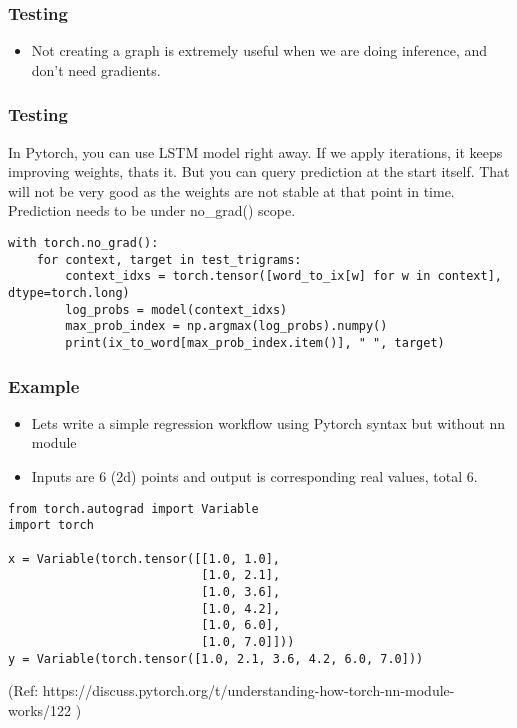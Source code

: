 \begin{frame}[fragile]
\frametitle{Testing}
\begin{itemize}
\item Not creating a graph is extremely useful when we are doing inference, and don't need gradients.
\end{itemize}
   
\end{frame} 

\begin{frame}[fragile]
\frametitle{Testing}
 In Pytorch, you can use LSTM model right away. If we apply iterations, it keeps improving weights, thats it. But you can query prediction at the start itself. That will not be very good as the weights are not stable at that point in time. Prediction needs to be under no\_grad() scope.
 
 \begin{lstlisting}
with torch.no_grad():
    for context, target in test_trigrams:
        context_idxs = torch.tensor([word_to_ix[w] for w in context], dtype=torch.long)
        log_probs = model(context_idxs)
        max_prob_index = np.argmax(log_probs).numpy()
        print(ix_to_word[max_prob_index.item()], " ", target)
\end{lstlisting}     
\end{frame} 

\begin{frame}[fragile]
\frametitle{Example}
 \begin{itemize}
\item Lets write a simple regression workflow using Pytorch syntax but without nn module
\item  
 Inputs are 6 (2d) points and output is corresponding real values, total 6.
 \end{itemize}

 \begin{lstlisting}
from torch.autograd import Variable
import torch

x = Variable(torch.tensor([[1.0, 1.0], 
                           [1.0, 2.1], 
                           [1.0, 3.6], 
                           [1.0, 4.2], 
                           [1.0, 6.0], 
                           [1.0, 7.0]]))
y = Variable(torch.tensor([1.0, 2.1, 3.6, 4.2, 6.0, 7.0]))
\end{lstlisting}   

{\tiny (Ref: https://discuss.pytorch.org/t/understanding-how-torch-nn-module-works/122 )} 
\end{frame} 

